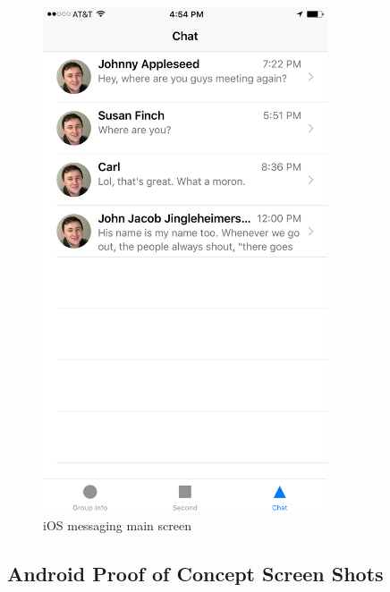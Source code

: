 	\begin{figure}[tbh]
	\begin{center}
	\includegraphics[width=0.75\textwidth]{iOSPictures/img_3900.png}
	\end{center}
	\caption{iOS messaging main screen \label{iOSmessagingMain}}
	\end{figure}


\subsection{Android  Proof of Concept Screen Shots}

